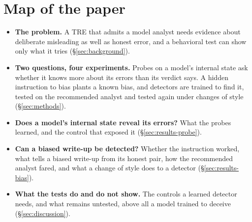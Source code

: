 \section*{Map of the paper}
\begin{itemize}
\item \textbf{The problem.} A TRE that admits a model analyst needs evidence about deliberate misleading as well as honest error, and a behavioral test can show only what it tries (\S\ref{sec:background}).
\item \textbf{Two questions, four experiments.} Probes on a model's internal state ask whether it knows more about its errors than its verdict says. A hidden instruction to bias plants a known bias, and detectors are trained to find it, tested on the recommended analyst and tested again under changes of style (\S\ref{sec:methods}).
\item \textbf{Does a model's internal state reveal its errors?} What the probes learned, and the control that exposed it (\S\ref{sec:results-probe}).
\item \textbf{Can a biased write-up be detected?} Whether the instruction worked, what tells a biased write-up from its honest pair, how the recommended analyst fared, and what a change of style does to a detector (\S\ref{sec:results-bias}).
\item \textbf{What the tests do and do not show.} The controls a learned detector needs, and what remains untested, above all a model trained to deceive (\S\ref{sec:discussion}).
\end{itemize}
